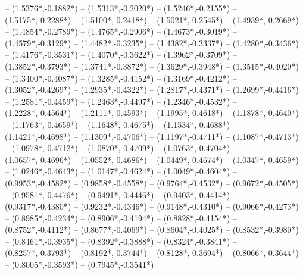{	-- ({1.5376*\dx},{-0.1882*\dy})
	-- ({1.5313*\dx},{-0.2020*\dy})
	-- ({1.5246*\dx},{-0.2155*\dy})
	-- ({1.5175*\dx},{-0.2288*\dy})
	-- ({1.5100*\dx},{-0.2418*\dy})
	-- ({1.5021*\dx},{-0.2545*\dy})
	-- ({1.4939*\dx},{-0.2669*\dy})
	-- ({1.4854*\dx},{-0.2789*\dy})
	-- ({1.4765*\dx},{-0.2906*\dy})
	-- ({1.4673*\dx},{-0.3019*\dy})
	-- ({1.4579*\dx},{-0.3129*\dy})
	-- ({1.4482*\dx},{-0.3235*\dy})
	-- ({1.4382*\dx},{-0.3337*\dy})
	-- ({1.4280*\dx},{-0.3436*\dy})
	-- ({1.4176*\dx},{-0.3531*\dy})
	-- ({1.4070*\dx},{-0.3622*\dy})
	-- ({1.3962*\dx},{-0.3709*\dy})
	-- ({1.3852*\dx},{-0.3793*\dy})
	-- ({1.3741*\dx},{-0.3872*\dy})
	-- ({1.3629*\dx},{-0.3948*\dy})
	-- ({1.3515*\dx},{-0.4020*\dy})
	-- ({1.3400*\dx},{-0.4087*\dy})
	-- ({1.3285*\dx},{-0.4152*\dy})
	-- ({1.3169*\dx},{-0.4212*\dy})
	-- ({1.3052*\dx},{-0.4269*\dy})
	-- ({1.2935*\dx},{-0.4322*\dy})
	-- ({1.2817*\dx},{-0.4371*\dy})
	-- ({1.2699*\dx},{-0.4416*\dy})
	-- ({1.2581*\dx},{-0.4459*\dy})
	-- ({1.2463*\dx},{-0.4497*\dy})
	-- ({1.2346*\dx},{-0.4532*\dy})
	-- ({1.2228*\dx},{-0.4564*\dy})
	-- ({1.2111*\dx},{-0.4593*\dy})
	-- ({1.1995*\dx},{-0.4618*\dy})
	-- ({1.1878*\dx},{-0.4640*\dy})
	-- ({1.1763*\dx},{-0.4659*\dy})
	-- ({1.1648*\dx},{-0.4675*\dy})
	-- ({1.1534*\dx},{-0.4688*\dy})
	-- ({1.1421*\dx},{-0.4698*\dy})
	-- ({1.1309*\dx},{-0.4706*\dy})
	-- ({1.1197*\dx},{-0.4711*\dy})
	-- ({1.1087*\dx},{-0.4713*\dy})
	-- ({1.0978*\dx},{-0.4712*\dy})
	-- ({1.0870*\dx},{-0.4709*\dy})
	-- ({1.0763*\dx},{-0.4704*\dy})
	-- ({1.0657*\dx},{-0.4696*\dy})
	-- ({1.0552*\dx},{-0.4686*\dy})
	-- ({1.0449*\dx},{-0.4674*\dy})
	-- ({1.0347*\dx},{-0.4659*\dy})
	-- ({1.0246*\dx},{-0.4643*\dy})
	-- ({1.0147*\dx},{-0.4624*\dy})
	-- ({1.0049*\dx},{-0.4604*\dy})
	-- ({0.9953*\dx},{-0.4582*\dy})
	-- ({0.9858*\dx},{-0.4558*\dy})
	-- ({0.9764*\dx},{-0.4532*\dy})
	-- ({0.9672*\dx},{-0.4505*\dy})
	-- ({0.9581*\dx},{-0.4476*\dy})
	-- ({0.9491*\dx},{-0.4446*\dy})
	-- ({0.9403*\dx},{-0.4414*\dy})
	-- ({0.9317*\dx},{-0.4380*\dy})
	-- ({0.9232*\dx},{-0.4346*\dy})
	-- ({0.9148*\dx},{-0.4310*\dy})
	-- ({0.9066*\dx},{-0.4273*\dy})
	-- ({0.8985*\dx},{-0.4234*\dy})
	-- ({0.8906*\dx},{-0.4194*\dy})
	-- ({0.8828*\dx},{-0.4154*\dy})
	-- ({0.8752*\dx},{-0.4112*\dy})
	-- ({0.8677*\dx},{-0.4069*\dy})
	-- ({0.8604*\dx},{-0.4025*\dy})
	-- ({0.8532*\dx},{-0.3980*\dy})
	-- ({0.8461*\dx},{-0.3935*\dy})
	-- ({0.8392*\dx},{-0.3888*\dy})
	-- ({0.8324*\dx},{-0.3841*\dy})
	-- ({0.8257*\dx},{-0.3793*\dy})
	-- ({0.8192*\dx},{-0.3744*\dy})
	-- ({0.8128*\dx},{-0.3694*\dy})
	-- ({0.8066*\dx},{-0.3644*\dy})
	-- ({0.8005*\dx},{-0.3593*\dy})
	-- ({0.7945*\dx},{-0.3541*\dy})
}
